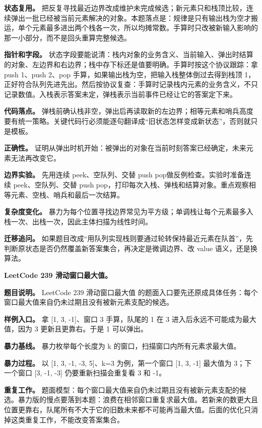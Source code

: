 \textbf{状态复用。} 把反复寻找最近边界改成维护未完成候选；新元素只和栈顶比较，连续弹出一批已经被当前元素解决的对象。本题落点是：规律是只有输出栈为空才搬运，单个元素最多进出两个栈各一次，所以均摊常数。手算时只改被新输入影响的那一小部分，而不是回头重算完整候选。

\textbf{指针和字段。} 状态字段要能说清：栈内对象的业务含义、当前输入、弹出时结算的对象、左边界和右边界；栈中存下标还是值要明确。手算时按这个协议跟踪：拿 push 1、push 2、pop 手算，如果输出栈为空，把输入栈整体倒过去得到栈顶 1，正好符合队列先进先出。然后按协议复查：手算时记录栈内元素的业务含义，不只记录数值。入栈表示答案未定，弹栈表示当前事件已经让它的答案定下来。

\textbf{代码落点。} 弹栈前确认栈非空，弹出后再读取新的左边界；相等元素和哨兵高度要有统一策略。关键代码行必须能逐句翻译成“旧状态怎样变成新状态”，否则就只是模板。

\textbf{正确性。} 证明从弹出时机开始：被弹出的对象在当前时刻答案已经确定，未来元素无法再改变它。

\textbf{边界实验。} 先用连续 peek、空队列、交替 push pop做反例检查。实验时准备连续 peek、空队列、交替 push pop，打印每次入栈、弹栈和结算对象。重点观察相等元素、空栈、哨兵和最后一次结算。

\textbf{复杂度变化。} 暴力为每个位置寻找边界常见为平方级；单调栈让每个元素最多入栈一次、出栈一次，因此主体扫描为线性时间。

\textbf{迁移追问。} 如果题目改成“用队列实现栈则要通过轮转保持最近元素在队首”，先判断原状态是否仍然覆盖新答案集合，再决定是微调边界、改 value 语义，还是换算法。

\noindent\textbf{LeetCode 239 滑动窗口最大值。}

\textbf{题目说明。} LeetCode 239 滑动窗口最大值 的题面入口要先还原成具体任务：每个窗口最大值来自仍未过期且没有被新元素支配的候选。

\textbf{样例入口。} 拿 [1, 3, -1]、窗口 3 手算，队尾的 1 在 3 进入后永远不可能成为最大值，因为 3 更新且更靠右。于是 1 可以弹出。

\textbf{暴力基线。} 暴力枚举每个长度为 k 的窗口，扫描窗口内所有元素求最大值。

\textbf{暴力过程。} 以 [1, 3, -1, -3, 5]、k=3 为例，第一个窗口 [1, 3, -1] 最大值为 3；下一个窗口 [3, -1, -3] 仍要重新扫描会重复看 3 和 -1。

\textbf{重复工作。} 题面模型：每个窗口最大值来自仍未过期且没有被新元素支配的候选。暴力版的慢点要落到本题：浪费在相邻窗口重复求最大值。若新来的数更大且位置更靠右，队尾所有不大于它的旧数未来都不可能再当最大值。后面的优化只消掉这类重复工作，不能改变答案集合。

